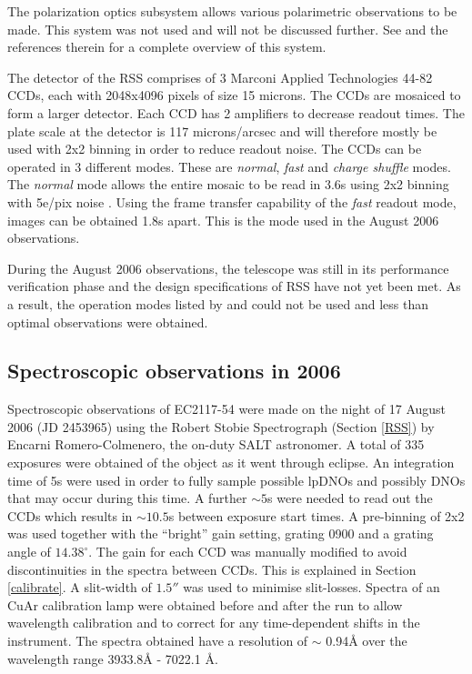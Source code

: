 The polarization optics subsystem allows various polarimetric observations to be made. This system was not used and will not be discussed further. See \cite{RSS_Modes} and the references therein for a complete overview of this system.

The detector of the RSS comprises of 3 Marconi Applied Technologies 44-82 CCDs, each with 2048x4096 pixels of size 15 microns. The CCDs are mosaiced to form a larger detector. Each CCD has 2 amplifiers to decrease readout times. The plate scale at the detector is 117 microns/arcsec and will therefore mostly be used with 2x2 binning in order to reduce readout noise. The CCDs can be operated in 3 different modes. These are \textit{normal}, \textit{fast} and \textit{charge shuffle} modes. The \textit{normal} mode allows the entire mosaic to be read in 3.6s using 2x2 binning with 5e/pix noise \citep{RSS_Modes}. Using the frame transfer capability of the \textit{fast} readout mode, images can be obtained 1.8s apart. This is the mode used in the August 2006 observations. 


During the August 2006 observations, the telescope was still in its performance verification phase and the design specifications of RSS have not yet been met. As a result, the operation modes listed by \cite{RSS_Modes} and \cite{RSS_Opt_Design} could not be used and less than optimal observations were obtained.






\subsection{Spectroscopic observations in 2006}
\label{obs_spec}


Spectroscopic observations of EC2117-54 were made on the night of 17 August 2006 (JD 2453965) using the Robert Stobie Spectrograph (Section \ref{RSS}) by Encarni Romero-Colmenero, the on-duty SALT astronomer. A total of 335 exposures were obtained of the object as it went through eclipse. An integration time of 5s were used in order to fully sample possible lpDNOs and possibly DNOs that may occur during this time. A further $\sim5$s were needed to read out the CCDs which results in $\sim10.5$s between exposure start times. A pre-binning of 2x2 was used together with the ``bright'' gain setting, grating 0900 and a grating angle of $14.38^{\circ}$. The gain for each CCD was manually modified to avoid discontinuities in the spectra between CCDs. This is explained in Section \ref{calibrate}. A slit-width of $1.5''$ was used to minimise slit-losses. Spectra of an CuAr calibration lamp were obtained before and after the run to allow wavelength calibration and to correct for any time-dependent shifts in the instrument. The spectra obtained have a resolution of $\sim$ 0.94\AA{} over the wavelength range 3933.8\AA{} - 7022.1 \AA{}.

